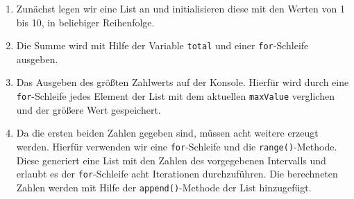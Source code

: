 \begin{enumerate}
	\item Zunächst legen wir eine List an und initialisieren diese mit den Werten von 1 bis 10, in beliebiger Reihenfolge.
	
	
	\item Die Summe wird mit Hilfe der Variable \lstinline$total$ und einer \lstinline$for$-Schleife ausgeben.
	
	
	\item Das Ausgeben des größten Zahlwerts auf der Konsole. Hierfür wird durch eine \lstinline$for$-Schleife jedes Element der List mit dem aktuellen \lstinline$maxValue$ verglichen und der größere Wert gespeichert. 
	 
	
	\item Da die ersten beiden Zahlen gegeben sind, müssen acht weitere erzeugt werden. Hierfür verwenden wir eine \lstinline$for$-Schleife und die \lstinline$range()$-Methode. Diese generiert eine List mit den Zahlen des vorgegebenen Intervalls und erlaubt es der \lstinline$for$-Schleife acht Iterationen durchzuführen. Die berechneten Zahlen werden mit Hilfe der \lstinline$append()$-Methode der List hinzugefügt. 
	
\end{enumerate}